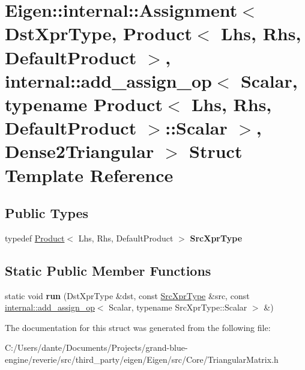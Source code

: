 \hypertarget{struct_eigen_1_1internal_1_1_assignment_3_01_dst_xpr_type_00_01_product_3_01_lhs_00_01_rhs_00_01efc05729801ac09d27a309f4f0923f27}{}\section{Eigen\+::internal\+::Assignment$<$ Dst\+Xpr\+Type, Product$<$ Lhs, Rhs, Default\+Product $>$, internal\+::add\+\_\+assign\+\_\+op$<$ Scalar, typename Product$<$ Lhs, Rhs, Default\+Product $>$\+::Scalar $>$, Dense2\+Triangular $>$ Struct Template Reference}
\label{struct_eigen_1_1internal_1_1_assignment_3_01_dst_xpr_type_00_01_product_3_01_lhs_00_01_rhs_00_01efc05729801ac09d27a309f4f0923f27}
\subsection*{Public Types}
\begin{DoxyCompactItemize}
\item 
\mbox{\label{struct_eigen_1_1internal_1_1_assignment_3_01_dst_xpr_type_00_01_product_3_01_lhs_00_01_rhs_00_01efc05729801ac09d27a309f4f0923f27_a6fe3d17d2688fd663e852200d8cf8579}} 
typedef \mbox{\hyperlink{class_eigen_1_1_product}{Product}}$<$ Lhs, Rhs, Default\+Product $>$ {\bfseries Src\+Xpr\+Type}
\end{DoxyCompactItemize}
\subsection*{Static Public Member Functions}
\begin{DoxyCompactItemize}
\item 
\mbox{\label{struct_eigen_1_1internal_1_1_assignment_3_01_dst_xpr_type_00_01_product_3_01_lhs_00_01_rhs_00_01efc05729801ac09d27a309f4f0923f27_ac07b3b214716b4f8d23d0ea9ca0ae493}} 
static void {\bfseries run} (Dst\+Xpr\+Type \&dst, const \mbox{\hyperlink{class_eigen_1_1_product}{Src\+Xpr\+Type}} \&src, const \mbox{\hyperlink{struct_eigen_1_1internal_1_1add__assign__op}{internal\+::add\+\_\+assign\+\_\+op}}$<$ Scalar, typename Src\+Xpr\+Type\+::\+Scalar $>$ \&)
\end{DoxyCompactItemize}


The documentation for this struct was generated from the following file\+:\begin{DoxyCompactItemize}
\item 
C\+:/\+Users/dante/\+Documents/\+Projects/grand-\/blue-\/engine/reverie/src/third\+\_\+party/eigen/\+Eigen/src/\+Core/Triangular\+Matrix.\+h\end{DoxyCompactItemize}
